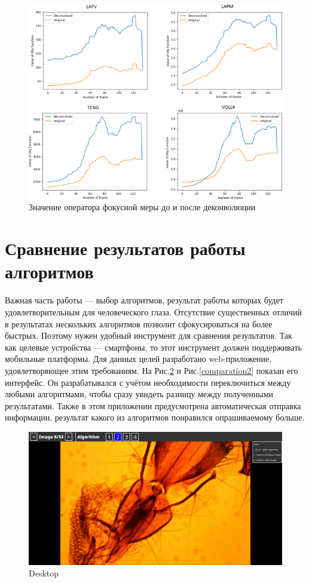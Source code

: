 \documentclass[14pt]{matmex-diploma-custom}
\begin{document}
\begin{figure}[h]
    \centering
    \includegraphics[width=1.0\textwidth]{figures/deconvolution2.png}
    \caption{Значение оператора фокусной меры до и после деконволюции}
    \label{deconvolution2}
\end{figure}


\section{Сравнение результатов работы алгоритмов}

Важная часть работы --- выбор алгоритмов, результат работы которых будет удовлетворительным для человеческого глаза. Отсутствие существенных отличий в результатах нескольких алгоритмов позволит сфокусироваться на более быстрых. Поэтому нужен удобный инструмент для сравнения результатов. Так как целевые устройства --- смартфоны, то этот инструмент должен поддерживать мобильные платформы. Для данных целей разработано web-приложение, удовлетворяющее этим требованиям. На Рис.\ref{comparation1} и Рис.\ref{comparation2} показан его интерфейс. Он разрабатывался с учётом необходимости переключиться между любыми алгоритмами, чтобы сразу увидеть разницу между полученными результатами. Также в этом приложении предусмотрена автоматическая отправка информации, результат какого из алгоритмов понравился опрашиваемому больше.

\begin{figure}[h]
    \centering
    \includegraphics[width=1.0\textwidth]{figures/comparasion1.jpg}
    \caption{Desktop}
    \label{comparation1}
\end{figure}
\end{document}
